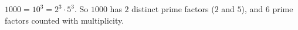 $1000=10^3=2^3\cdot5^3$. So $1000$ has $\boxed{2}$ distinct prime factors ($2$ and $5$), and $\boxed{6}$ prime factors counted with multiplicity.
